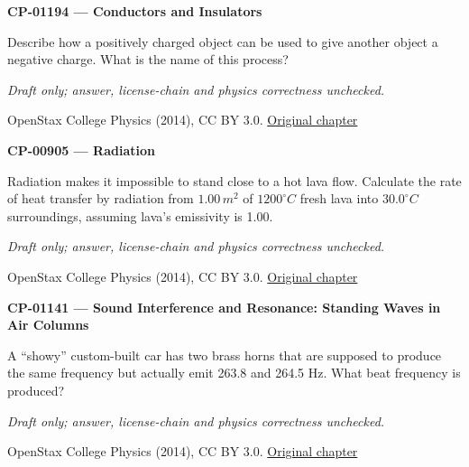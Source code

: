 \par\medskip
\noindent\textbf{CP-01194 — Conductors and Insulators}
\par Describe how a positively charged object can be used to give another object a negative charge. What is the name of this process?
\par\smallskip
\textit{Draft only; answer, license-chain and physics correctness unchecked.}
\par{\footnotesize OpenStax College Physics (2014), CC BY 3.0. \href{https://github.com/philschatz/physics-book/blob/a7efaa7e221fab1694022d8bb98b83a73ee31d3d/contents/m42306.md}{Original chapter}}\par\normalsize

\par\medskip
\noindent\textbf{CP-00905 — Radiation}
\par Radiation makes it impossible to stand close to a hot lava flow. Calculate the rate of heat transfer by radiation from $1.00\,{m}^{2}$ of $1200^{\circ}C$ fresh lava into $30.0^{\circ}C$ surroundings, assuming lava’s emissivity is 1.00.
\par\smallskip
\textit{Draft only; answer, license-chain and physics correctness unchecked.}
\par{\footnotesize OpenStax College Physics (2014), CC BY 3.0. \href{https://github.com/philschatz/physics-book/blob/a7efaa7e221fab1694022d8bb98b83a73ee31d3d/contents/m42230.md}{Original chapter}}\par\normalsize

\par\medskip
\noindent\textbf{CP-01141 — Sound Interference and Resonance: Standing Waves in Air Columns}
\par A “showy” custom-built car has two brass horns that are supposed to produce the same frequency but actually emit 263.8 and 264.5 Hz. What beat frequency is produced?
\par\smallskip
\textit{Draft only; answer, license-chain and physics correctness unchecked.}
\par{\footnotesize OpenStax College Physics (2014), CC BY 3.0. \href{https://github.com/philschatz/physics-book/blob/a7efaa7e221fab1694022d8bb98b83a73ee31d3d/contents/m42296.md}{Original chapter}}\par\normalsize


